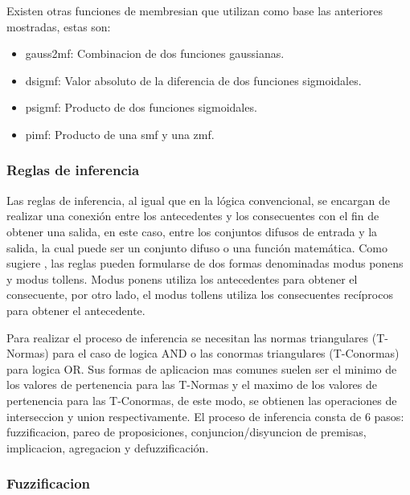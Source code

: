             Existen otras funciones de membresian que utilizan como base las anteriores mostradas, estas son:

            \begin{itemize}[leftmargin=\parindent]
                \item gauss2mf: Combinacion de dos funciones gaussianas.
                \item dsigmf: Valor absoluto de la diferencia de dos funciones sigmoidales.
                \item psigmf: Producto de dos funciones sigmoidales.
                \item pimf: Producto de una smf y una zmf.
            \end{itemize}
        
        \subsubsection{Reglas de inferencia}
            
            Las reglas de inferencia, al igual que en la lógica convencional, se encargan de realizar una conexión entre los antecedentes y los consecuentes con el fin de obtener una salida, en este caso, entre los conjuntos difusos de entrada y la salida, la cual puede ser un conjunto difuso o una función matemática. Como sugiere \textcite{cruz2010inteligencia}, las reglas pueden formularse de dos formas denominadas modus ponens y modus tollens. Modus ponens utiliza los antecedentes para obtener el consecuente, por otro lado, el modus tollens utiliza los consecuentes recíprocos para obtener el antecedente.
                        
            Para realizar el proceso de inferencia se necesitan las normas triangulares (T-Normas) para el caso de logica AND o las conormas triangulares (T-Conormas) para logica OR. Sus formas de aplicacion mas comunes suelen ser el minimo de los valores de pertenencia para las T-Normas y el maximo de los valores de pertenencia para las T-Conormas, de este modo, se obtienen las operaciones de interseccion y union respectivamente. El proceso de inferencia consta de 6 pasos: fuzzificacion, pareo de proposiciones,  conjuncion/disyuncion de premisas, implicacion, agregacion y defuzzificación.
        
        \subsubsection{Fuzzificacion}
            
